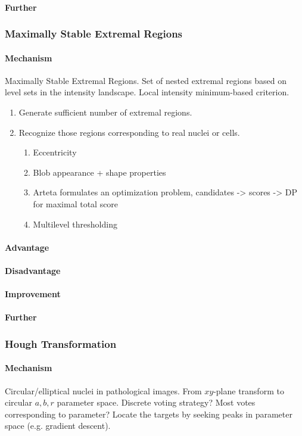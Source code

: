 \documentclass[10pt,a4paper]{article}
\begin{document}
\paragraph{Further}

\subsubsection{Maximally Stable Extremal Regions}
\paragraph{Mechanism}
Maximally Stable Extremal Regions. Set of nested extremal regions based on level sets in the intensity landscape. Local intensity minimum-based criterion.
\begin{enumerate}
	\item Generate sufficient number of extremal regions.
	\item Recognize those regions corresponding to real nuclei or cells.
	\begin{enumerate}
		\item Eccentricity
		\item Blob appearance + shape properties
		\item Arteta formulates an optimization problem, candidates -> scores -> DP for maximal total score
		\item Multilevel thresholding
	\end{enumerate}
\end{enumerate}
\paragraph{Advantage}
\paragraph{Disadvantage}
\paragraph{Improvement}
\paragraph{Further}

\subsubsection{Hough Transformation}
\paragraph{Mechanism}
Circular/elliptical nuclei in pathological images. From $xy$-plane transform to circular $a,b,r$ parameter space. Discrete voting strategy? Most votes corresponding to parameter? Locate the targets by seeking peaks in parameter space (e.g. gradient descent). 
\end{document}
